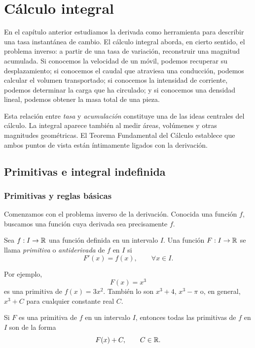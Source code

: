 \chapter{Cálculo integral}
\label{ch:integral}

En el capítulo anterior estudiamos la derivada como herramienta para describir una tasa instantánea de cambio. El cálculo integral aborda, en cierto sentido, el problema inverso: a partir de una tasa de variación, reconstruir una magnitud acumulada. Si conocemos la velocidad de un móvil, podemos recuperar su desplazamiento; si conocemos el caudal que atraviesa una conducción, podemos calcular el volumen transportado; si conocemos la intensidad de corriente, podemos determinar la carga que ha circulado; y si conocemos una densidad lineal, podemos obtener la masa total de una pieza.

Esta relación entre \emph{tasa} y \emph{acumulación} constituye una de las ideas centrales del cálculo. La integral aparece también al medir áreas, volúmenes y otras magnitudes geométricas. El Teorema Fundamental del Cálculo establece que ambos puntos de vista están íntimamente ligados con la derivación.

\section{Primitivas e integral indefinida}
\label{sec:primitivas}

\subsection{Primitivas y reglas básicas}

Comenzamos con el problema inverso de la derivación. Conocida una función $f$, buscamos una función cuya derivada sea precisamente $f$.

\begin{definition}[Primitiva]
Sea $f:I\to\mathbb{R}$ una función definida en un intervalo $I$. Una función $F:I\to\mathbb{R}$ se llama \emph{primitiva} o \emph{antiderivada} de $f$ en $I$ si
\[
F'(x)=f(x),\qquad \forall x\in I.
\]
\end{definition}

Por ejemplo,
\[
F(x)=x^3
\]
es una primitiva de $f(x)=3x^2$. También lo son $x^3+4$, $x^3-\pi$ o, en general, $x^3+C$ para cualquier constante real $C$.

\begin{theorem}
Si $F$ es una primitiva de $f$ en un intervalo $I$, entonces todas las primitivas de $f$ en $I$ son de la forma
\[
F(x)+C,\qquad C\in\mathbb{R}.
\]
\end{theorem}

